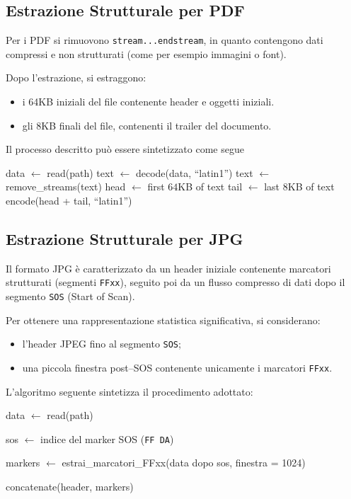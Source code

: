 \documentclass{report}
\begin{document}
\subsection{Estrazione Strutturale per PDF}

Per i PDF si rimuovono \texttt{stream...endstream}, in quanto contengono dati compressi e non strutturati (come per esempio immagini o font).

Dopo l'estrazione, si estraggono:
\begin{itemize}
    \item i 64KB iniziali del file contenente header e oggetti iniziali.
    \item gli 8KB finali del file, contenenti il trailer del documento.
\end{itemize}

Il processo descritto può essere sintetizzato come segue

\bigskip


\begin{algorithm}[H]
\caption{Estrazione strutturale PDF}

data $\gets$ read(path)\;
text $\gets$ decode(data, ``latin1'')\;
text $\gets$ remove\_streams(text)\;
head $\gets$ first $64$KB of text\;
tail $\gets$ last $8$KB of text\;
\Return encode(head + tail, ``latin1'')
\end{algorithm}


\subsection{Estrazione Strutturale per JPG}

Il formato JPG è caratterizzato da un header iniziale contenente marcatori strutturati (segmenti \texttt{FFxx}), seguito poi da un flusso compresso
di dati dopo il segmento \texttt{SOS} (Start of Scan).

Per ottenere una rappresentazione statistica significativa, si considerano:
\begin{itemize}
    \item l’header JPEG fino al segmento \texttt{SOS};
    \item una piccola finestra post–SOS contenente unicamente i marcatori \texttt{FFxx}.
\end{itemize}


L’algoritmo seguente sintetizza il procedimento adottato:

\bigskip

\begin{algorithm}[H]
\caption{Estrazione strutturale JPEG}

data $\gets$ read(path)\;


sos $\gets$ indice del marker SOS (\texttt{FF DA})\;


markers $\gets$ estrai\_marcatori\_FFxx(data dopo sos, finestra = 1024)\;

\Return concatenate(header, markers)\;
\end{algorithm}
\end{document}
